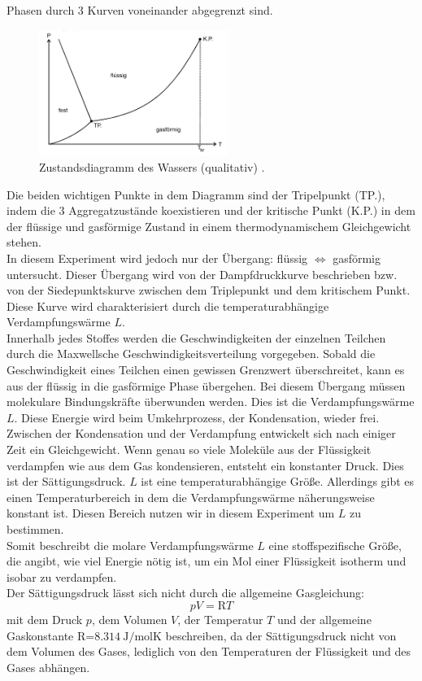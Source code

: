\glqq Phasen\grqq{} durch 3 Kurven voneinander abgegrenzt sind.\\
\begin{figure}[H]
    \centering
    \includegraphics[width=0.55\textwidth]{images/Diagramm.PNG}
    \caption{Zustandsdiagramm des Wassers (qualitativ) \protect \cite{V203}.}
    \label{img:Zustand}
\end{figure}
\noindent Die beiden wichtigen Punkte in dem Diagramm sind der Tripelpunkt (TP.), indem die 
3 Aggregatzustände koexistieren und der kritische Punkt (K.P.) in dem der flüssige und gasförmige Zustand in einem 
thermodynamischem Gleichgewicht stehen.\\
In diesem Experiment wird jedoch nur der Übergang: flüssig $\Leftrightarrow$ gasförmig untersucht. 
Dieser Übergang wird von der Dampfdruckkurve beschrieben bzw. von der Siedepunktskurve zwischen dem Triplepunkt und dem kritischem Punkt.
Diese Kurve wird charakterisiert durch die temperaturabhängige Verdampfungswärme $L$. \\
Innerhalb jedes Stoffes werden die Geschwindigkeiten der einzelnen Teilchen
durch die Maxwellsche Geschwindigkeitsverteilung vorgegeben. Sobald die Geschwindigkeit eines Teilchen einen gewissen Grenzwert 
überschreitet, kann es aus der flüssig in die gasförmige Phase übergehen. Bei diesem Übergang müssen molekulare Bindungskräfte überwunden
werden. Dies ist die Verdampfungswärme $L$. Diese Energie wird beim Umkehrprozess, der Kondensation, wieder frei.\\
Zwischen der Kondensation und der Verdampfung entwickelt sich nach einiger Zeit ein Gleichgewicht.
Wenn genau so viele Moleküle aus der Flüssigkeit verdampfen wie aus dem Gas kondensieren, entsteht ein konstanter Druck.
Dies ist der Sättigungsdruck. $L$ ist eine temperaturabhängige Größe.
Allerdings gibt es einen Temperaturbereich in dem die Verdampfungswärme näherungsweise konstant ist.
Diesen Bereich nutzen wir in diesem Experiment um $L$ zu bestimmen.\\
Somit beschreibt die molare Verdampfungswärme $L$ eine stoffspezifische Größe, die angibt, wie viel Energie nötig ist,
um ein Mol einer Flüssigkeit isotherm und isobar zu verdampfen.\\
Der Sättigungsdruck lässt sich nicht durch die allgemeine Gasgleichung:
\begin{equation}
    pV=\text{R}T
    \label{eqn:Gasgl}
\end{equation}
mit dem Druck $p$, dem Volumen $V$, der Temperatur $T$ und der allgemeine Gaskonstante R=$\SI{8.314}{\joule\per\mole\kelvin}$ 
beschreiben, da der Sättigungsdruck nicht von dem Volumen des Gases, lediglich von den Temperaturen der Flüssigkeit 
und des Gases abhängen.
\\

